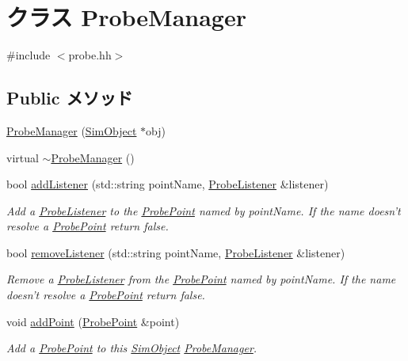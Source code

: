 \hypertarget{classProbeManager}{
\section{クラス ProbeManager}
\label{classProbeManager}
}


{\ttfamily \#include $<$probe.hh$>$}\subsection*{Public メソッド}
\begin{DoxyCompactItemize}
\item 
\hyperlink{classProbeManager_ada1bd1d8f7a1eb066d7770a38ecb608d}{ProbeManager} (\hyperlink{classSimObject}{SimObject} $\ast$obj)
\item 
virtual \hyperlink{classProbeManager_a18e6749a51789dfcbf2703e4f91ebe9f}{$\sim$ProbeManager} ()
\item 
bool \hyperlink{classProbeManager_a3d7e44846a13cad7b35eb12c48bd0d4a}{addListener} (std::string pointName, \hyperlink{classProbeListener}{ProbeListener} \&listener)
\begin{DoxyCompactList}\small\item\em Add a \hyperlink{classProbeListener}{ProbeListener} to the \hyperlink{classProbePoint}{ProbePoint} named by pointName. If the name doesn't resolve a \hyperlink{classProbePoint}{ProbePoint} return false. \item\end{DoxyCompactList}\item 
bool \hyperlink{classProbeManager_a97f18fd46da811d5e592045255c16aab}{removeListener} (std::string pointName, \hyperlink{classProbeListener}{ProbeListener} \&listener)
\begin{DoxyCompactList}\small\item\em Remove a \hyperlink{classProbeListener}{ProbeListener} from the \hyperlink{classProbePoint}{ProbePoint} named by pointName. If the name doesn't resolve a \hyperlink{classProbePoint}{ProbePoint} return false. \item\end{DoxyCompactList}\item 
void \hyperlink{classProbeManager_ad003f80b62472f5f14c0088bac25d218}{addPoint} (\hyperlink{classProbePoint}{ProbePoint} \&point)
\begin{DoxyCompactList}\small\item\em Add a \hyperlink{classProbePoint}{ProbePoint} to this \hyperlink{classSimObject}{SimObject} \hyperlink{classProbeManager}{ProbeManager}. \item\end{DoxyCompactList}\end{DoxyCompactItemize}
